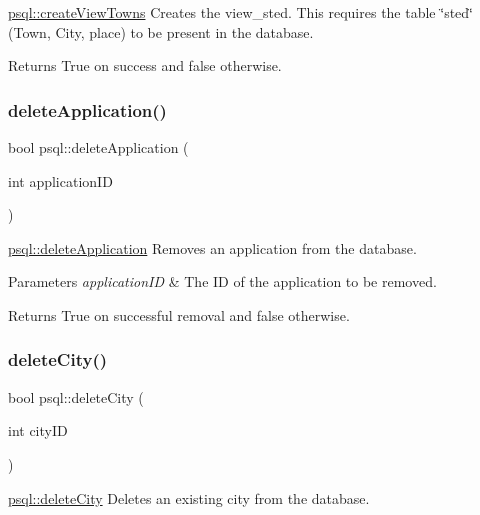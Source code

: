\mbox{\hyperlink{classpsql_ac5b1230ac405a600b67b144060b33a0d}{psql\+::create\+View\+Towns}} Creates the view\+\_\+sted. This requires the table \char`\"{}sted\char`\"{} (Town, City, place) to be present in the database. 

\begin{DoxyReturn}{Returns}
True on success and false otherwise. 
\end{DoxyReturn}
\mbox{\label{classpsql_a999ee8e2d813892411ef502ebc055a79}} 
\subsubsection{\texorpdfstring{delete\+Application()}{deleteApplication()}}
{\footnotesize\ttfamily bool psql\+::delete\+Application (\begin{DoxyParamCaption}\item[{int}]{application\+ID }\end{DoxyParamCaption})}



\mbox{\hyperlink{classpsql_a999ee8e2d813892411ef502ebc055a79}{psql\+::delete\+Application}} Removes an application from the database. 


\begin{DoxyParams}{Parameters}
{\em application\+ID} & The ID of the application to be removed. \\
\hline
\end{DoxyParams}
\begin{DoxyReturn}{Returns}
True on successful removal and false otherwise. 
\end{DoxyReturn}
\mbox{\label{classpsql_aaffd42b26b635d9881daaf5fbf4fd62f}} 
\subsubsection{\texorpdfstring{delete\+City()}{deleteCity()}}
{\footnotesize\ttfamily bool psql\+::delete\+City (\begin{DoxyParamCaption}\item[{int}]{city\+ID }\end{DoxyParamCaption})}



\mbox{\hyperlink{classpsql_aaffd42b26b635d9881daaf5fbf4fd62f}{psql\+::delete\+City}} Deletes an existing city from the database. 


